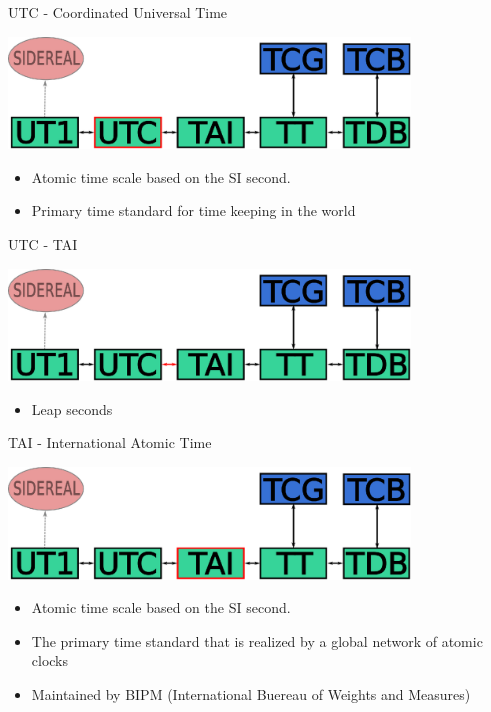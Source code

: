 \documentclass[14pt,table,t, c]{beamer}
\begin{document}
\begin{frame}{UTC - Coordinated Universal Time}
\begin{center}
	\includegraphics[width=0.8\textwidth]{figure/utc}
\end{center}
\begin{itemize}
\item Atomic time scale based on the SI second.
\item Primary time standard for time keeping in the world
\end{itemize}
\end{frame}

\begin{frame}{UTC - TAI}
\begin{center}
	\includegraphics[width=0.8\textwidth]{figure/utc_tai}
\end{center}
\begin{itemize}
\item Leap seconds
\end{itemize}
\end{frame}

\begin{frame}{TAI - International Atomic Time}
\begin{center}
	\includegraphics[width=0.8\textwidth]{figure/tai}
\end{center}
\begin{itemize}
\item Atomic time scale based on the SI second.
\item The primary time standard that is realized by a global network of atomic clocks
\item Maintained by BIPM (International Buereau of Weights and Measures)
\end{itemize}
\end{frame}
\end{document}
